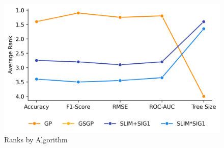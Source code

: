 
    \begin{figure}[H]
    \centering
    \includegraphics[width=\linewidth]{../Latex/Chapters/Figures/Results/final_comparison_ranks.png}
    \caption{Ranks by Algorithm}
    \label{fig:final_comparison_ranks}
    \end{figure}
    